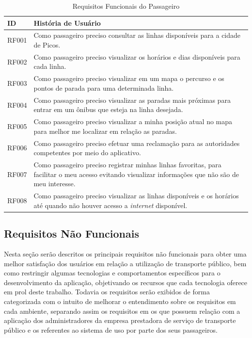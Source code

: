 {{\renewcommand{\arraystretch}{2}
\begin{table}[H]
\centering
\caption{Requisitos Funcionais do Passageiro}
\label{tab:passageiro-requisitos-funcionais}
\begin{tabular}{ l | p{13.5cm} }
\hline
\textbf{ID} & \textbf{História de Usuário} \\
\hline
RF001 & Como passageiro preciso consultar as linhas disponíveis para a cidade de Picos.\\ \hline
RF002 & Como passageiro preciso visualizar os horários e dias disponíveis para cada linha. \\ \hline
RF003 & Como passageiro preciso visualizar em um mapa o percurso e os pontos de parada para uma determinada linha. \\ \hline
RF004 & Como passageiro preciso visualizar as paradas mais próximas para entrar em um ônibus que esteja na linha desejada. \\ \hline
RF005 & Como passageiro preciso visualizar a minha posição atual no mapa para melhor me localizar em relação as paradas. \\ \hline
RF006 & Como passageiro preciso efetuar uma reclamação para as autoridades competentes por meio do aplicativo. \\ \hline
RF007 & Como passageiro preciso registrar minhas linhas favoritas, para facilitar o meu acesso evitando visualizar informações que não são de meu interesse. \\ \hline
RF008 & Como passageiro preciso visualizar as linhas disponíveis e os horários até quando não houver acesso a \textit{internet} disponível. \\ \hline
\end{tabular}
\end{table}

\subsection{Requisitos Não Funcionais}

Nesta seção serão descritos os principais requisitos não funcionais para obter uma melhor satisfação dos usuários em relação a utilização de transporte público, bem como restringir algumas tecnologias e comportamentos específicos para o desenvolvimento da aplicação, objetivando os recursos que cada tecnologia oferece em prol deste trabalho. Todavia os requisitos serão exibidos de forma categorizada com o intuito de melhorar o entendimento sobre os requisitos em cada ambiente, separando assim os requisitos em os que possuem relação com a aplicação dos administradores da empresa prestadora de serviço de transporte público e os referentes ao sistema de uso por parte dos seus passageiros.

}}
